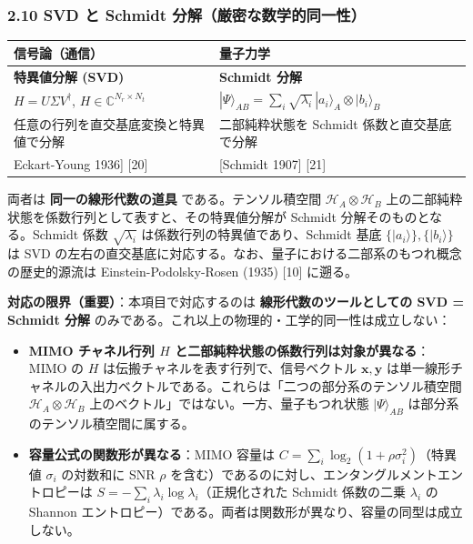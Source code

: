 \documentclass[
]{ltjsarticle}
\newcounter{none} %
\providecommand{\tightlist}{%
  \setlength{\itemsep}{0pt}\setlength{\parskip}{0pt}}
\begin{document}
\subsubsection{2.10 SVD と Schmidt
分解（厳密な数学的同一性）}\label{svd-ux3068-schmidt-ux5206ux89e3ux53b3ux5bc6ux306aux6570ux5b66ux7684ux540cux4e00ux6027}

{\def\LTcaptype{none} %
\begin{longtable}[]{@{}
  >{\raggedright\arraybackslash}p{}
  >{\raggedright\arraybackslash}p{}@{}}
\toprule\noalign{}
\begin{minipage}[b]{\linewidth}\raggedright
信号論（通信）
\end{minipage} & \begin{minipage}[b]{\linewidth}\raggedright
量子力学
\end{minipage} \\
\midrule\noalign{}
\endhead
\bottomrule\noalign{}
\endlastfoot
\textbf{特異値分解 (SVD)} & \textbf{Schmidt 分解} \\
\(H = U \Sigma V^\dagger\), \(H \in \mathbb{C}^{N_r \times N_t}\) &
\(|\Psi\rangle_{AB} = \sum_i \sqrt{\lambda_i} \, |a_i\rangle_A \otimes |b_i\rangle_B\) \\
任意の行列を直交基底変換と特異値で分解 & 二部純粋状態を Schmidt
係数と直交基底で分解 \\
{[}Eckart-Young 1936{]} {[}20{]} & {[}Schmidt 1907{]} {[}21{]} \\
\end{longtable}
}

両者は \textbf{同一の線形代数の道具} である。テンソル積空間
\(\mathcal{H}_A \otimes \mathcal{H}_B\)
上の二部純粋状態を係数行列として表すと、その特異値分解が Schmidt
分解そのものとなる。Schmidt 係数 \(\sqrt{\lambda_i}\)
は係数行列の特異値であり、Schmidt 基底
\(\{|a_i\rangle\}, \{|b_i\rangle\}\) は SVD
の左右の直交基底に対応する。なお、量子における二部系のもつれ概念の歴史的源流は
Einstein-Podolsky-Rosen (1935) {[}10{]} に遡る。

\textbf{対応の限界（重要）}：本項目で対応するのは
\textbf{線形代数のツールとしての SVD = Schmidt 分解}
のみである。これ以上の物理的・工学的同一性は成立しない：

\begin{itemize}
\tightlist
\item
  \textbf{MIMO チャネル行列 \(H\)
  と二部純粋状態の係数行列は対象が異なる}：MIMO の \(H\)
  は伝搬チャネルを表す行列で、信号ベクトル \(\mathbf{x}, \mathbf{y}\)
  は単一線形チャネルの入出力ベクトルである。これらは「二つの部分系のテンソル積空間
  \(\mathcal{H}_A \otimes \mathcal{H}_B\)
  上のベクトル」ではない。一方、量子もつれ状態 \(|\Psi\rangle_{AB}\)
  は部分系のテンソル積空間に属する。
\item
  \textbf{容量公式の関数形が異なる}：MIMO 容量は
  \(C = \sum_i \log_2(1 + \rho \sigma_i^2)\)（特異値 \(\sigma_i\)
  の対数和に SNR \(\rho\)
  を含む）であるのに対し、エンタングルメントエントロピーは
  \(S = -\sum_i \lambda_i \log \lambda_i\)（正規化された Schmidt
  係数の二乗 \(\lambda_i\) の Shannon
  エントロピー）である。両者は関数形が異なり、容量の同型は成立しない。
\end{itemize}
\end{document}
